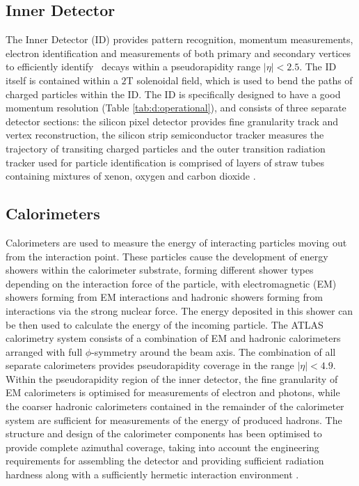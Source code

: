 	\subsection{Inner Detector}
	\label{d:id}

		The Inner Detector \cite{innerdetector} (ID) provides pattern recognition, momentum measurements, electron identification and measurements of both primary and secondary vertices to efficiently identify \bhadron\, decays within a pseudorapidity range $|\eta|<2.5$. The ID itself is contained within a $2$T solenoidal field, which is used to bend the paths of charged particles within the ID. The ID is specifically designed to have a good momentum resolution (Table \ref{tab:d:operational}), and consists of three separate detector sections: the silicon pixel detector provides fine granularity track and vertex reconstruction, the silicon strip semiconductor tracker measures the trajectory of transiting charged particles and the outer transition radiation tracker used for particle identification is comprised of layers of straw tubes containing mixtures of xenon, oxygen and carbon dioxide \cite{ATLAS}.

	\subsection{Calorimeters}
	\label{d:cal}

		Calorimeters are used to measure the energy of interacting particles moving out from the interaction point. These particles cause the development of energy showers within the calorimeter substrate, forming different shower types depending on the interaction force of the particle, with electromagnetic (EM)  showers forming from EM interactions and hadronic showers forming from interactions via the strong nuclear force. The energy deposited in this shower can be then used to calculate the energy of the incoming particle. The ATLAS calorimetry system consists of a combination of EM and hadronic calorimeters arranged with full $\phi$-symmetry around the beam axis. The combination of all separate calorimeters provides pseudorapidity coverage in the range $|\eta| < 4.9$. Within the pseudorapidity region of the inner detector, the fine granularity of EM calorimeters is optimised for measurements of electron and photons, while the coarser hadronic calorimeters contained in the remainder of the calorimeter system are sufficient for measurements of the energy of produced hadrons. The structure and design of the calorimeter components has been optimised to provide complete azimuthal coverage, taking into account the engineering requirements for assembling the detector and providing sufficient radiation hardness along with a sufficiently hermetic interaction environment \cite{ATLAS}.

